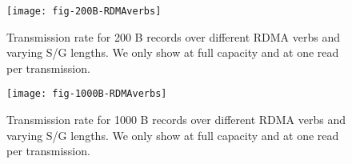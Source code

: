 \begin{figure}[t]
\texttt{[image: fig-200B-RDMAverbs]}
\caption{Transmission rate for 200 B records over different RDMA verbs and 
varying S/G lengths. We only show  at full capacity and  at one read per transmission.}
\label{fig:200B_transrate}
\texttt{[image: fig-1000B-RDMAverbs]}
\caption{Transmission rate for 1000 B records over different RDMA verbs and 
varying S/G lengths. We only show  at full capacity and  at one read per transmission.}
\label{fig:1000B_transrate}
\end{figure}
